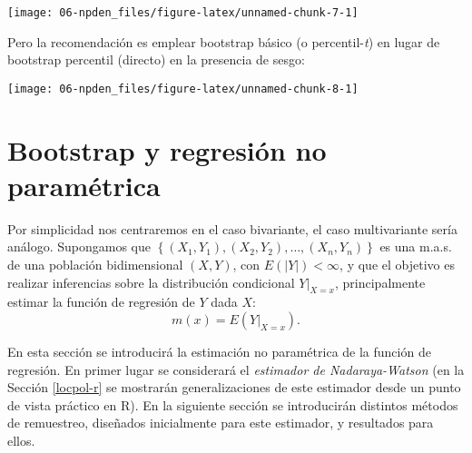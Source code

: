 \documentclass[
]{book}
\newenvironment{Shaded}{\begin{snugshade}}{\end{snugshade}}
\newcommand{\AttributeTok}[1]{\textcolor[rgb]{0.77,0.63,0.00}{#1}}
\newcommand{\DecValTok}[1]{\textcolor[rgb]{0.00,0.00,0.81}{#1}}
\newcommand{\FunctionTok}[1]{\textcolor[rgb]{0.00,0.00,0.00}{#1}}
\newcommand{\NormalTok}[1]{#1}
\newcommand{\SpecialCharTok}[1]{\textcolor[rgb]{0.00,0.00,0.00}{#1}}
\newcommand{\StringTok}[1]{\textcolor[rgb]{0.31,0.60,0.02}{#1}}
\theoremstyle{break}
\theoremstyle{definition}
\theoremstyle{definition}
\theoremstyle{definition}
\theoremstyle{definition}
\theoremstyle{remark}
\begin{document}
\begin{center}\texttt{[image: 06-npden\_files/figure-latex/unnamed-chunk-7-1]} \end{center}

Pero la recomendación es emplear bootstrap básico (o percentil-\emph{t}) en lugar
de bootstrap percentil (directo) en la presencia de sesgo:

\begin{Shaded}
\end{Shaded}

\begin{center}\texttt{[image: 06-npden\_files/figure-latex/unnamed-chunk-8-1]} \end{center}

\hypertarget{npreg}{%
\chapter{Bootstrap y regresión no paramétrica}\label{npreg}}

Por simplicidad nos centraremos en el caso bivariante, el caso multivariante sería análogo.
Supongamos que \(\left\{ \left( X_1,Y_1 \right),\left( X_2,Y_2 \right), \ldots, \left( X_n,Y_n \right) \right\}\) es una m.a.s. de una población bidimensional \(\left( X,Y \right)\), con \(E\left( \left\vert Y\right\vert \right) <\infty\), y que el objetivo es realizar inferencias sobre la distribución condicional \(\left. Y \right\vert_{X=x}\), principalmente estimar la función de regresión de \(Y\) dada \(X\):
\[m\left( x \right) =E\left( \left. Y\right\vert_{X=x} \right).\]

En esta sección se introducirá la estimación no paramétrica de la función de regresión.
En primer lugar se considerará el \emph{estimador de Nadaraya-Watson} (en la Sección \ref{locpol-r} se mostrarán generalizaciones de este estimador desde un punto de vista práctico en R).
En la siguiente sección se introducirán distintos métodos de remuestreo, diseñados inicialmente para este estimador, y resultados para ellos.
\end{document}
